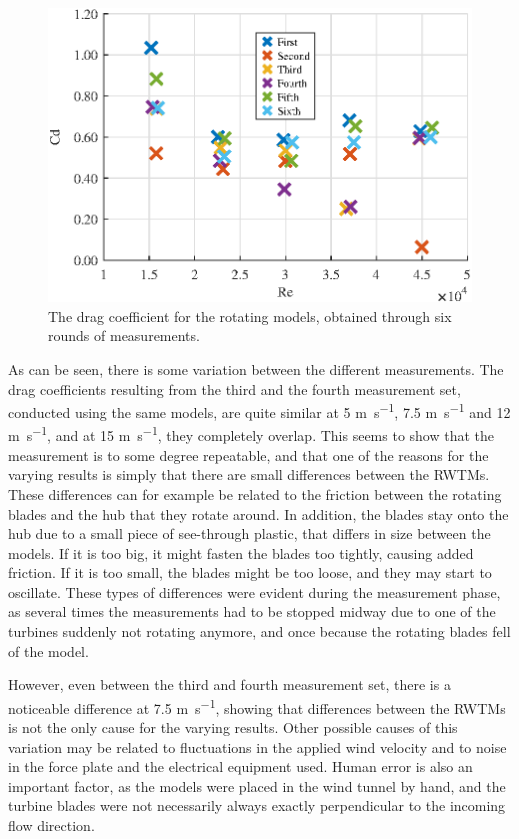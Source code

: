 \begin{figure}
    \centering
    \includegraphics[width=\linewidth]{0_Images/RotationalCDRe.eps}
    \caption{The drag coefficient for the rotating models, obtained through six rounds of measurements.}
    \label{fig:RotationalCD}
\end{figure}

As can be seen, there is some variation between the different measurements. The drag coefficients resulting from the third and the fourth measurement set, conducted using the same models, are quite similar at 5 \si{\m\per\s}, 7.5 \si{\m\per\s} and 12 \si{\m\per\s}, and at 15 \si{\m\per\s}, they completely overlap. This seems to show that the measurement is to some degree repeatable, and that one of the reasons for the varying results is simply that there are small differences between the \gls{RWTM}s. These differences can for example be related to the friction between the rotating blades and the hub that they rotate around. In addition, the blades stay onto the hub due to a small piece of see-through plastic, that differs in size between the models. If it is too big, it might fasten the blades too tightly, causing added friction. If it is too small, the blades might be too loose, and they may start to oscillate. These types of differences were evident during the measurement phase, as several times the measurements had to be stopped midway due to one of the turbines suddenly not rotating anymore, and once because the rotating blades fell of the model.  


However, even between the third and fourth measurement set, there is a noticeable difference at 7.5 \si{\m\per\s}, showing that differences between the \gls{RWTM}s is not the only cause for the varying results. Other possible causes of this variation may be related to fluctuations in the applied wind velocity and to noise in the force plate and the electrical equipment used. Human error is also an important factor, as the models were placed in the wind tunnel by hand, and the turbine blades were not necessarily always exactly perpendicular to the incoming flow direction.   

